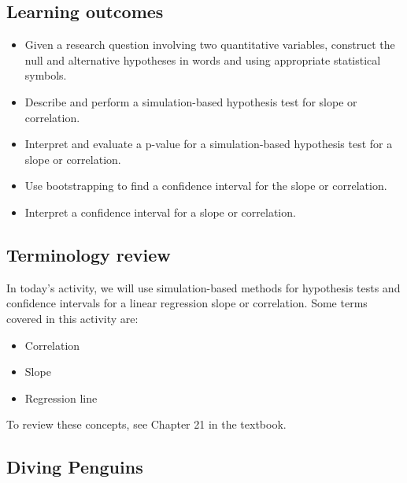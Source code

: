 \documentclass[
]{report}
\begin{document}
\hypertarget{learning-outcomes-25}{%
\subsection{Learning outcomes}\label{learning-outcomes-25}}

\begin{itemize}
\item
  Given a research question involving two quantitative variables, construct the null and alternative hypotheses
  in words and using appropriate statistical symbols.
\item
  Describe and perform a simulation-based hypothesis test for slope or correlation.
\item
  Interpret and evaluate a p-value for a simulation-based hypothesis test for a slope or correlation.
\item
  Use bootstrapping to find a confidence interval for the slope or correlation.
\item
  Interpret a confidence interval for a slope or correlation.
\end{itemize}

\hypertarget{terminology-review-21}{%
\subsection{Terminology review}\label{terminology-review-21}}

In today's activity, we will use simulation-based methods for hypothesis tests and confidence intervals for a linear regression slope or correlation. Some terms covered in this activity are:

\begin{itemize}
\item
  Correlation
\item
  Slope
\item
  Regression line
\end{itemize}

To review these concepts, see Chapter 21 in the textbook.

\hypertarget{diving-penguins}{%
\subsection{Diving Penguins}\label{diving-penguins}}
\end{document}
